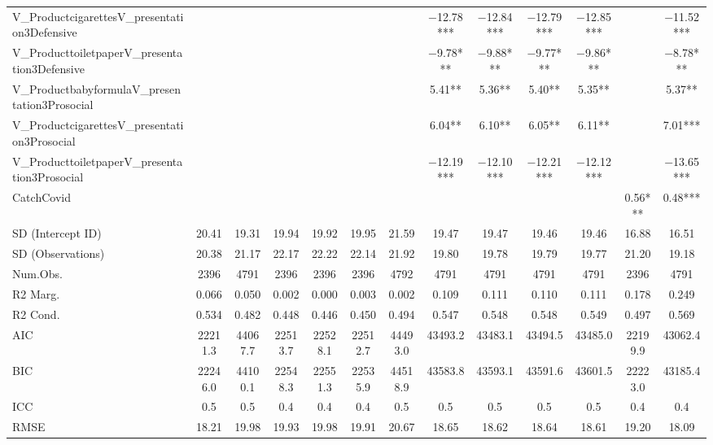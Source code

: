 \documentclass[]{report}
\begin{document}
\begin{landscape}
\begin{table}
{\begin{tabular}[t]{lcccccccccccc}
			V\_ProductcigarettesV\_presentation3Defensive &  &  &  &  &  &  & \num{-12.78}*** & \num{-12.84}*** & \num{-12.79}*** & \num{-12.85}*** &  & \num{-11.52}***\\
			V\_ProducttoiletpaperV\_presentation3Defensive &  &  &  &  &  &  & \num{-9.78}*** & \num{-9.88}*** & \num{-9.77}*** & \num{-9.86}*** &  & \num{-8.78}***\\
			V\_ProductbabyformulaV\_presentation3Prosocial &  &  &  &  &  &  & \num{5.41}** & \num{5.36}** & \num{5.40}** & \num{5.35}** &  & \num{5.37}**\\
			V\_ProductcigarettesV\_presentation3Prosocial &  &  &  &  &  &  & \num{6.04}** & \num{6.10}** & \num{6.05}** & \num{6.11}** &  & \num{7.01}***\\
			V\_ProducttoiletpaperV\_presentation3Prosocial &  &  &  &  &  &  & \num{-12.19}*** & \num{-12.10}*** & \num{-12.21}*** & \num{-12.12}*** &  & \num{-13.65}***\\
			CatchCovid &  &  &  &  &  &  &  &  &  &  & \num{0.56}*** & \num{0.48}***\\
			SD (Intercept ID) & \num{20.41} & \num{19.31} & \num{19.94} & \num{19.92} & \num{19.95} & \num{21.59} & \num{19.47} & \num{19.47} & \num{19.46} & \num{19.46} & \num{16.88} & \num{16.51}\\
			SD (Observations) & \num{20.38} & \num{21.17} & \num{22.17} & \num{22.22} & \num{22.14} & \num{21.92} & \num{19.80} & \num{19.78} & \num{19.79} & \num{19.77} & \num{21.20} & \num{19.18}\\
			\midrule
			Num.Obs. & \num{2396} & \num{4791} & \num{2396} & \num{2396} & \num{2396} & \num{4792} & \num{4791} & \num{4791} & \num{4791} & \num{4791} & \num{2396} & \num{4791}\\
			R2 Marg. & \num{0.066} & \num{0.050} & \num{0.002} & \num{0.000} & \num{0.003} & \num{0.002} & \num{0.109} & \num{0.111} & \num{0.110} & \num{0.111} & \num{0.178} & \num{0.249}\\
			R2 Cond. & \num{0.534} & \num{0.482} & \num{0.448} & \num{0.446} & \num{0.450} & \num{0.494} & \num{0.547} & \num{0.548} & \num{0.548} & \num{0.549} & \num{0.497} & \num{0.569}\\
			AIC & \num{22211.3} & \num{44067.7} & \num{22513.7} & \num{22528.1} & \num{22512.7} & \num{44493.0} & \num{43493.2} & \num{43483.1} & \num{43494.5} & \num{43485.0} & \num{22199.9} & \num{43062.4}\\
			BIC & \num{22246.0} & \num{44100.1} & \num{22548.3} & \num{22551.3} & \num{22535.9} & \num{44518.9} & \num{43583.8} & \num{43593.1} & \num{43591.6} & \num{43601.5} & \num{22223.0} & \num{43185.4}\\
			ICC & \num{0.5} & \num{0.5} & \num{0.4} & \num{0.4} & \num{0.4} & \num{0.5} & \num{0.5} & \num{0.5} & \num{0.5} & \num{0.5} & \num{0.4} & \num{0.4}\\
			RMSE & \num{18.21} & \num{19.98} & \num{19.93} & \num{19.98} & \num{19.91} & \num{20.67} & \num{18.65} & \num{18.62} & \num{18.64} & \num{18.61} & \num{19.20} & \num{18.09}\\
			\bottomrule
	\end{tabular}}
	\end{table}
	
\end{landscape}
\end{document}
